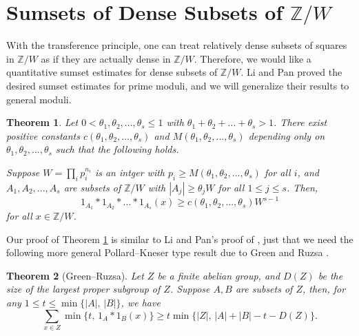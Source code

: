 \documentclass[11pt]{amsart}
\theoremstyle{plain} %
\newtheorem{thm}{Theorem}[section]
\theoremstyle{remark}
\numberwithin{equation}{section}
\newcommand{\Z}{\mathbb{Z}}
\begin{document}
\section{Sumsets of Dense Subsets of $\mathbb{Z}/W$}\label{sec: sumsets}

With the transference principle, one can treat relatively dense subsets of squares in $\Z/W$ as if they are actually dense in $\Z/W$. Therefore, we would like a quantitative sumset estimates for dense subsets of $\Z/W$. Li and Pan \cite[Lemma 3.3]{LiPan} proved the desired sumset estimates for prime moduli, and we will generalize their results to general moduli.

\begin{thm}\label{sumsets}
    Let $0<\theta_1,\theta_2,...,\theta_s\leq 1$ with $\theta_1+\theta_2+...+\theta_s>1$. There exist positive constants $c(\theta_1,\theta_2,...,\theta_s)$ and $M(\theta_1,\theta_2,...,\theta_s)$ depending only on $\theta_1,\theta_2,...,\theta_s$ such that the following holds.

    Suppose $W=\prod_i p_i^{n_i}$ is an intger with $p_i\geq M(\theta_1,\theta_2,...,\theta_s)$ for all $i$, and $A_1,A_2,...,A_s$ are subsets of $\Z/W$ with $|A_j|\geq \theta_j W$ for all $1\leq j\leq s$. Then,
    \begin{equation*}
        1_{A_1}*1_{A_2}*...*1_{A_s}(x)\geq c(\theta_1,\theta_2,...,\theta_s)W^{s-1}
    \end{equation*}
    for all $x\in \Z/W$.
\end{thm}

Our proof of Theorem \ref{sumsets} is similar to Li and Pan's proof of \cite[Lemma 3.3]{LiPan}, just that we need the following more general Pollard--Kneser type result due to Green and Ruzsa \cite[Proposition 6.1]{GreenRuzsa}.

\begin{thm}[Green--Ruzsa]\label{Green--Ruzsa}
    Let $Z$ be a finite abelian group, and $D(Z)$ be the size of the largest proper subgroup of $Z$. Suppose $A,B$ are subsets of $Z$, then, for any $1\leq t\leq \min \{|A|,\,|B|\}$, we have
    \begin{equation*}
        \sum_{x\in Z} \min \{t,\,1_A*1_B(x)\}\geq t\min \{|Z|,\,|A|+|B|-t-D(Z)\}.
    \end{equation*}
\end{thm}
\end{document}
